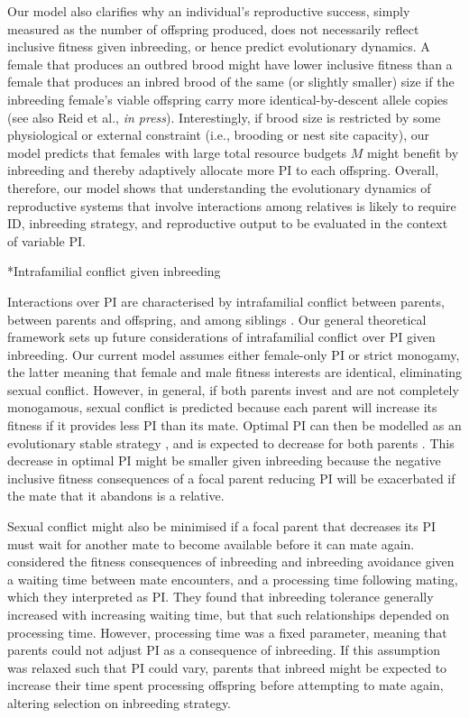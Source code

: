 \documentclass[12pt]{article}
\makeatletter
\renewcommand\subsection{\@startsection{subsection}{1}{-0.25in}{-0.5\baselineskip}{0.1\baselineskip}{\normalfont\normalsize\bfseries\textit}}
\makeatother
\begin{document}
Our model also clarifies why an individual's reproductive success, simply measured as the number of offspring produced, does not necessarily reflect inclusive fitness given inbreeding, or hence predict evolutionary dynamics. A female that produces an outbred brood might have lower inclusive fitness than a female that produces an inbred brood of the same (or slightly smaller) size if the inbreeding female's viable offspring carry more identical-by-descent allele copies (see also Reid et al., \textit{in press}). Interestingly, if brood size is restricted by some physiological or external constraint (i.e., brooding or nest site capacity), our model predicts that females with large total resource budgets $M$ might benefit by inbreeding and thereby adaptively allocate more PI to each offspring. Overall, therefore, our model shows that understanding the evolutionary dynamics of reproductive systems that involve interactions among relatives is likely to require ID, inbreeding strategy, and reproductive output to be evaluated in the context of variable PI.

\subsection*{Intrafamilial conflict given inbreeding}

Interactions over PI are characterised by intrafamilial conflict between parents, between parents and offspring, and among siblings \cite[][]{Parker2002}. Our general theoretical framework sets up future considerations of intrafamilial conflict over PI given inbreeding. Our current model assumes either female-only PI or strict monogamy, the latter meaning that female and male fitness interests are identical, eliminating sexual conflict. However, in general, if both parents invest and are not completely monogamous, sexual conflict is predicted because each parent will increase its fitness if it provides less PI than its mate. Optimal PI can then be modelled as an evolutionary stable strategy \cite[][]{Smith1977}, and is expected to decrease for both parents \cite[][]{Parker1985}. This decrease in optimal PI might be smaller given inbreeding because the negative inclusive fitness consequences of a focal parent reducing PI will be exacerbated if the mate that it abandons is a relative. 

Sexual conflict might also be minimised if a focal parent that decreases its PI must wait for another mate to become available before it can mate again. \cite{Kokko2006} considered the fitness consequences of inbreeding and inbreeding avoidance given a waiting time between mate encounters, and a processing time following mating, which they interpreted as PI. They found that inbreeding tolerance generally increased with increasing waiting time, but that such relationships depended on processing time.  However, processing time was a fixed parameter, meaning that parents could not adjust PI as a consequence of inbreeding. If this assumption was relaxed such that PI could vary, parents that inbreed might be expected to increase their time spent processing offspring before attempting to mate again, altering selection on inbreeding strategy.
\end{document}
